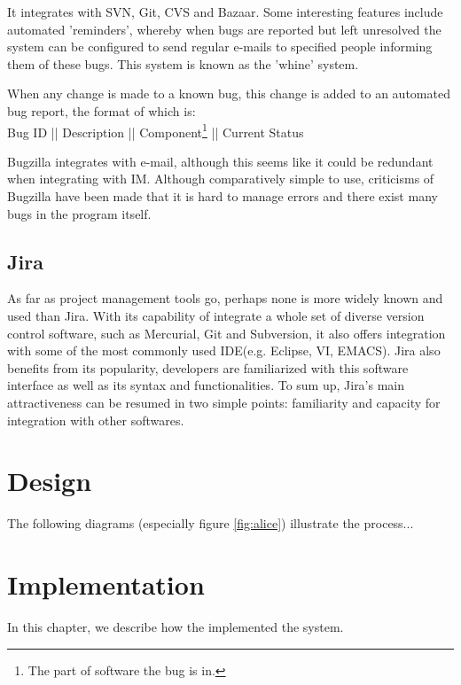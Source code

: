 \documentclass{l3proj}
\begin{document}
It integrates with SVN, Git, CVS and Bazaar.  Some interesting
features include automated 'reminders', whereby when bugs are
reported but left unresolved the system can be configured to send
regular e-mails to specified people informing them of these bugs.
This system is known as the 'whine' system.  

When any change is made to a known bug, this change is added to an
automated bug report, the format of which is:\\
Bug ID || Description || Component\footnote{The part of software the
  bug is in.} || Current Status

Bugzilla integrates with e-mail, although this seems like it could be
redundant when integrating with IM.  
Although comparatively simple to use, criticisms of Bugzilla have been
made that it is hard to manage errors and there exist many bugs in the
program itself.  


\section{Jira}
\label{jira}

As far as project management tools go, perhaps none is more widely known and used than Jira. With its capability of integrate a whole set of diverse version control software, such as Mercurial, Git and Subversion, it also offers integration with some of the most commonly used IDE(e.g. Eclipse, VI, EMACS). Jira also benefits from its popularity, developers are familiarized with this software interface as well as its syntax and functionalities. To sum up, Jira’s main attractiveness can be resumed in two simple points: familiarity and capacity for integration with other softwares.


\chapter{Design}
\label{design}

The following diagrams (especially figure \ref{fig:alice}) illustrate the
process...

\chapter{Implementation}
\label{impl}

In this chapter, we describe how the implemented the system.

\end{document}
